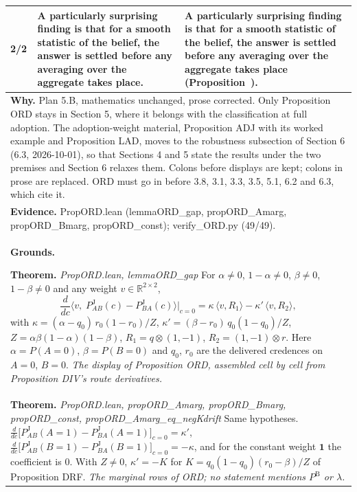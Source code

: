 \documentclass[10pt]{article}
\theoremstyle{definition}
\newcommand{\PB}{P^{\mathrm{B}}}
\newcommand{\PJ}{P^{\mathrm{J}}}
\renewcommand{\ref}[1]{\textsc{\detokenize{#1}}}
\newlength{\fullw}\setlength{\fullw}{25.9cm}
\begin{document}
{\begin{longtable}{|p{0.9cm}|p{12.2cm}|p{12.2cm}|}
2/2 & A particularly surprising finding is that for a smooth statistic of the belief, the answer is settled before any averaging over the aggregate takes place. & A particularly surprising finding is that for a smooth statistic of the belief, the answer is settled before any averaging over the aggregate takes place (Proposition~\ref{prop:ORD}). \\ \hline
\multicolumn{3}{|p{\fullw}|}{\textbf{Why.} Plan 5.B, mathematics unchanged, prose corrected. Only Proposition ORD stays in Section 5, where it belongs with the classification at full adoption. The adoption-weight material, Proposition ADJ with its worked example and Proposition LAD, moves to the robustness subsection of Section 6 (6.3, 2026-10-01), so that Sections 4 and 5 state the results under the two premises and Section 6 relaxes them. Colons before displays are kept; colons in prose are replaced. ORD must go in before 3.8, 3.1, 3.3, 3.5, 5.1, 6.2 and 6.3, which cite it.} \\
\multicolumn{3}{|p{\fullw}|}{\textbf{Evidence.} PropORD.lean (lemmaORD\_gap, propORD\_Amarg, propORD\_Bmarg, propORD\_const); verify\_ORD.py (49/49).} \\ \hline
\multicolumn{3}{|p{\fullw}|}{\textbf{Grounds.}\par \textbf{Theorem.} \textit{PropORD.lean, lemmaORD\_gap} \newline For $\alpha\neq0$, $1-\alpha\neq0$, $\beta\neq0$, $1-\beta\neq0$ and any
weight $v\in\mathbb R^{2\times2}$,
\[
\frac{d}{dc}\bigl\langle v,\;\PJ_{AB}(c)-\PJ_{BA}(c)\bigr\rangle\Big|_{c=0}
 =\kappa\,\langle v,R_1\rangle-\kappa'\,\langle v,R_2\rangle,
\]
with $\kappa=(\alpha-q_0)\,r_0(1-r_0)/Z$, $\kappa'=(\beta-r_0)\,q_0(1-q_0)/Z$,
$Z=\alpha\beta(1-\alpha)(1-\beta)$, $R_1=q\otimes(1,-1)$, $R_2=(1,-1)\otimes r$.
Here $\alpha=P(A{=}0)$, $\beta=P(B{=}0)$ and $q_0$, $r_0$ are the delivered
credences on $A{=}0$, $B{=}0$. \newline \textit{The display of Proposition ORD, assembled cell by cell from Proposition DIV's route derivatives.}} \\
\multicolumn{3}{|p{\fullw}|}{\textbf{Theorem.} \textit{PropORD.lean, propORD\_Amarg, propORD\_Bmarg, propORD\_const, propORD\_Amarg\_eq\_negKdrift} \newline Same hypotheses. $\frac{d}{dc}\bigl[\PJ_{AB}(A{=}1)-\PJ_{BA}(A{=}1)\bigr]_{c=0}=\kappa'$,
$\frac{d}{dc}\bigl[\PJ_{AB}(B{=}1)-\PJ_{BA}(B{=}1)\bigr]_{c=0}=-\kappa$, and for the
constant weight $\mathbf 1$ the coefficient is $0$. With $Z\neq0$,
$\kappa'=-K$ for $K=q_0(1-q_0)(r_0-\beta)/Z$ of Proposition DRF. \newline \textit{The marginal rows of ORD; no statement mentions $\PB$ or $\lambda$.}} \\

\end{longtable}}
\end{document}

